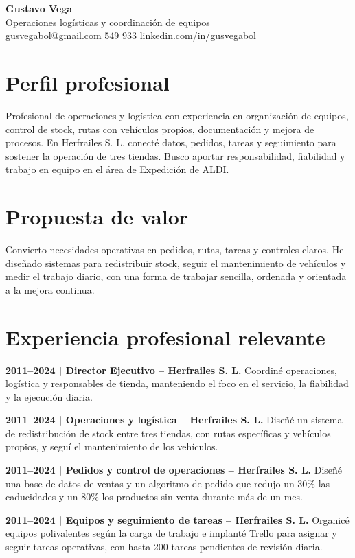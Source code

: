 \documentclass[11pt,a4paper]{article}
\begin{document}
\pagestyle{empty}
\begin{center}
{\Large\textbf{Gustavo Vega}}\\
Operaciones logísticas y coordinación de equipos\\
gusvegabol@gmail.com  549 933 \quad linkedin.com/in/gusvegabol
\end{center}
\section*{Perfil profesional}
Profesional de operaciones y logística con experiencia en organización de equipos, control de stock, rutas con vehículos propios, documentación y mejora de procesos. En Herfrailes S. L. conecté datos, pedidos, tareas y seguimiento para sostener la operación de tres tiendas. Busco aportar responsabilidad, fiabilidad y trabajo en equipo en el área de Expedición de ALDI.
\section*{Propuesta de valor}
Convierto necesidades operativas en pedidos, rutas, tareas y controles claros. He diseñado sistemas para redistribuir stock, seguir el mantenimiento de vehículos y medir el trabajo diario, con una forma de trabajar sencilla, ordenada y orientada a la mejora continua.
\section*{Experiencia profesional relevante}
\textbf{2011--2024 | Director Ejecutivo -- Herfrailes S. L.} Coordiné operaciones, logística y responsables de tienda, manteniendo el foco en el servicio, la fiabilidad y la ejecución diaria.

\textbf{2011--2024 | Operaciones y logística -- Herfrailes S. L.} Diseñé un sistema de redistribución de stock entre tres tiendas, con rutas específicas y vehículos propios, y seguí el mantenimiento de los vehículos.

\textbf{2011--2024 | Pedidos y control de operaciones -- Herfrailes S. L.} Diseñé una base de datos de ventas y un algoritmo de pedido que redujo un 30\% las caducidades y un 80\% los productos sin venta durante más de un mes.

\textbf{2011--2024 | Equipos y seguimiento de tareas -- Herfrailes S. L.} Organicé equipos polivalentes según la carga de trabajo e implanté Trello para asignar y seguir tareas operativas, con hasta 200 tareas pendientes de revisión diaria.
\end{document}
